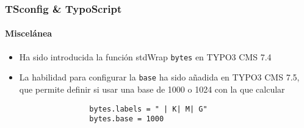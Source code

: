 \begin{frame}[fragile]
	\frametitle{TSconfig \& TypoScript}
	\framesubtitle{Miscelánea}

	\begin{itemize}

		\item Ha sido introducida la función stdWrap \texttt{bytes} en TYPO3 CMS 7.4

		\item La habilidad para configurar la \texttt{base} ha sido añadida en TYPO3 CMS 7.5,
			que permite definir si usar una base de 1000 o 1024 con la que calcular

			\begin{lstlisting}
				bytes.labels = " | K| M| G"
				bytes.base = 1000
			\end{lstlisting}

	\end{itemize}

\end{frame}

